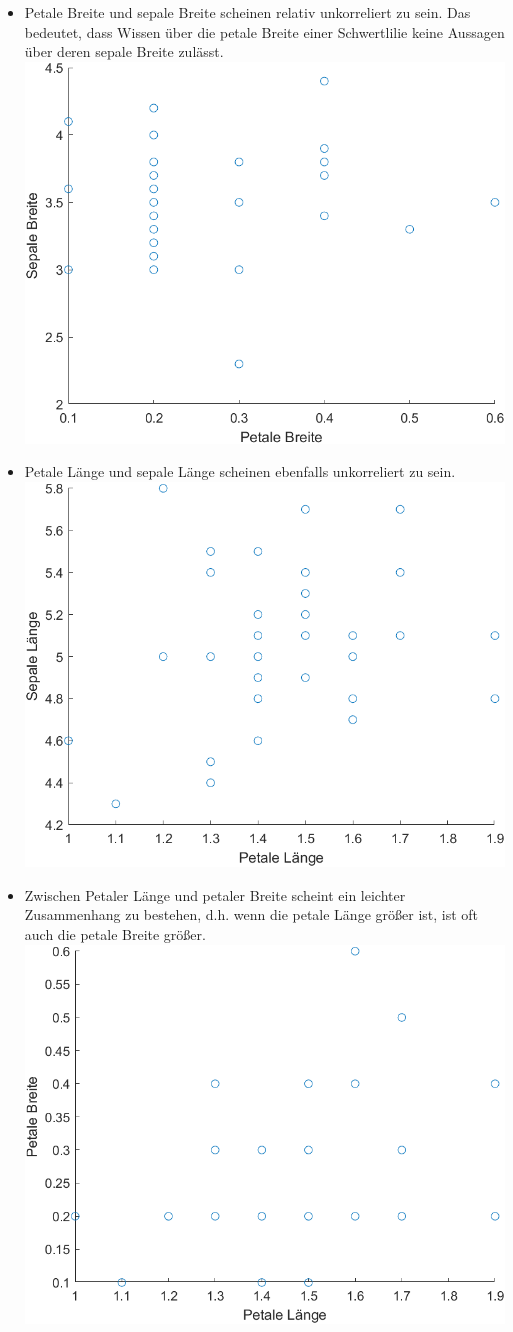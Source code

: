 \documentclass[a4paper]{scrartcl}
\begin{document}
\begin{itemize}
		\item Petale Breite und sepale Breite scheinen relativ unkorreliert zu sein. Das bedeutet, dass Wissen über die petale Breite einer Schwertlilie keine Aussagen über deren sepale Breite zulässt.\\ \includegraphics[width=0.7\linewidth]{assignment2_data/plots/4fi}
		\item Petale Länge und sepale Länge scheinen ebenfalls unkorreliert zu sein.\\ \includegraphics[width=0.7\linewidth]{assignment2_data/plots/4fii}
		\item Zwischen Petaler Länge und petaler Breite scheint ein leichter Zusammenhang zu bestehen, d.h. wenn die petale Länge größer ist, ist oft auch die petale Breite größer.\\ \includegraphics[width=0.7\linewidth]{assignment2_data/plots/4fiii}

\end{itemize}
\end{document}
